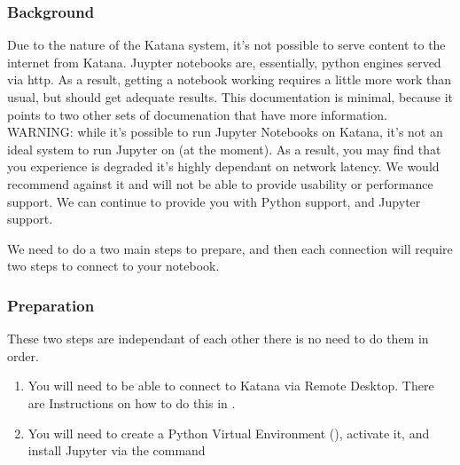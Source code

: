 \documentclass[letterpaper,10pt,english]{sphinxmanual}
\begin{document}
\subsubsection{Background}
\label{\detokenize{software/python-jupyter-notebooks:background}}
Due to the nature of the Katana system, it’s not possible to serve content to the internet from Katana. Juypter notebooks are, essentially, python engines served via http. As a result, getting a notebook working requires a little more work than usual, but should get adequate results. This documentation is minimal, because it points to two other sets of documenation that have more information. WARNING: while it’s possible to run Jupyter Notebooks on Katana, it’s not an ideal system to run Jupyter on (at the moment). As a result, you may find that you experience is degraded \sphinxhyphen{} it’s highly dependant on network latency. We would recommend against it and will not be able to provide usability or performance support. We can continue to provide you with Python support, and Jupyter support.

We need to do a two main steps to prepare, and then each connection will require two steps to connect to your notebook.


\subsubsection{Preparation}
\label{\detokenize{software/python-jupyter-notebooks:preparation}}
These two steps are independant of each other \sphinxhyphen{} there is no need to do them in order.
\begin{enumerate}
%
\item {} 
You will need to be able to connect to Katana via Remote Desktop. There are Instructions on how to do this in {\hyperref[\detokenize{using_katana/accessing_katana:graphical-session}]{}}.

\item {} 
You will need to create a Python Virtual Environment ({\hyperref[\detokenize{software/python-virtualenvs:python-virtual-environments}]{}}), activate it, and install Jupyter via the command 

\end{enumerate}
\end{document}
